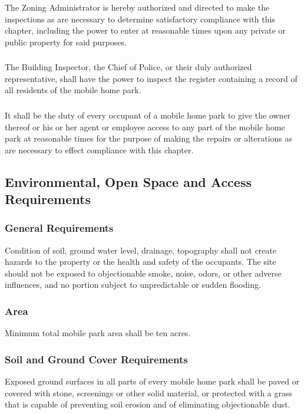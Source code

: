 \subsubsection{}
The Zoning Administrator is hereby authorized and directed to make the inspections as are necessary to determine satisfactory compliance with this chapter, including the power to enter at reasonable times upon any private or public property for said purposes.
\subsubsection{}
The Building Inspector, the Chief of Police, or their duly authorized representative, shall have the power to inspect the register containing a record of all residents of the mobile home park.
\subsubsection{}
It shall be the duty of every occupant of a mobile home park to give the owner thereof or his or her agent or employee access to any part of the mobile home park at reasonable times for the purpose of making the repairs or alterations as are necessary to effect compliance with this chapter.
\subsection{Environmental, Open Space and Access Requirements}
\subsubsection{General Requirements}
Condition of soil, ground water level, drainage, topography shall not create hazards to the property or the health and safety of the occupants. The site should not be exposed to objectionable smoke, noise, odors, or other adverse influences, and no portion subject to unpredictable or sudden flooding.
\subsubsection{Area}
Minimum total mobile park area shall be ten acres.
\subsubsection{Soil and Ground Cover Requirements}
Exposed ground surfaces in all parts of every mobile home park shall be paved or covered with stone, screenings or other solid material, or protected with a grass that is capable of preventing soil erosion and of eliminating objectionable dust.
